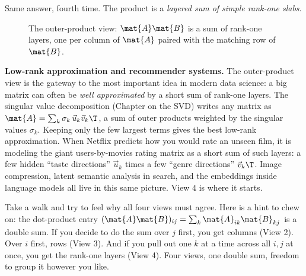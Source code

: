 Same answer, fourth time. The product is a \emph{layered sum of simple rank-one slabs}.

\begin{figure}[H]
\centering
{}
\caption{The outer-product view: $\mat{A}\mat{B}$ is a sum of rank-one layers, one per
column of $\mat{A}$ paired with the matching row of $\mat{B}$.}
\label{ch08:outerprod}
\end{figure}

\begin{applicationbox}
\textbf{Low-rank approximation and recommender systems.} The outer-product view is the
gateway to the most important idea in modern data science: a big matrix can often be
\emph{well approximated} by a short sum of rank-one layers. The singular value
decomposition (Chapter on the SVD) writes any matrix as
$\mat{A} = \sum_k \sigma_k\, \vec{u}_k \vec{v}_k\T$, a sum of outer products weighted by
the singular values $\sigma_k$. Keeping only the few largest terms gives the best
low-rank approximation. When Netflix predicts how you would rate an unseen film, it is
modeling the giant users-by-movies rating matrix as a short sum of such layers: a few
hidden ``taste directions'' $\vec{u}_k$ times a few ``genre directions'' $\vec{v}_k\T$.
Image compression, latent semantic analysis in search, and the embeddings inside
language models all live in this same picture. View 4 is where it starts.
\end{applicationbox}

\begin{walkbox}
Take a walk and try to feel why all four views must agree. Here is a hint to chew on:
the dot-product entry $(\mat{A}\mat{B})_{ij} = \sum_k \mat{A}_{ik}\mat{B}_{kj}$ is a
double sum. If you decide to do the sum over $j$ first, you get columns (View 2). Over
$i$ first, rows (View 3). And if you pull out one $k$ at a time across all $i,j$ at
once, you get the rank-one layers (View 4). Four views, one double sum, freedom to
group it however you like.
\end{walkbox}


